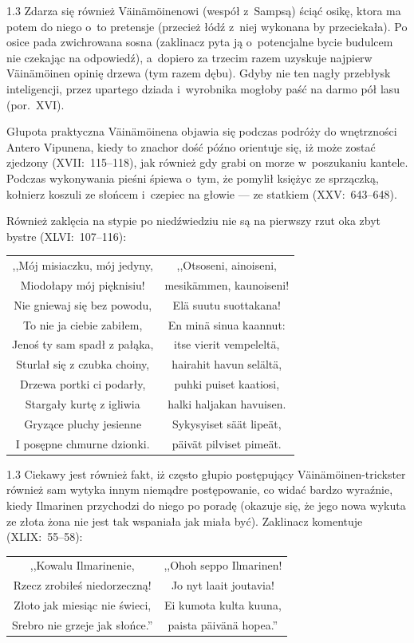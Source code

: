 \documentclass[11pt,a4paper,twoside]{report}
\begin{document}
\begin{spacing}{1.3}
Zdarza się również Väinämöinenowi (wespół z~Sampsą) ściąć osikę, ktora ma potem do niego o~to pretensje (przecież łódź z~niej wykonana by przeciekała). Po osice pada zwichrowana sosna (zaklinacz pyta ją o~potencjalne bycie budulcem nie czekając na odpowiedź), a~dopiero za trzecim razem uzyskuje najpierw Väinämöinen opinię drzewa (tym razem dębu). Gdyby nie ten nagły przebłysk inteligencji, przez upartego dziada i~wyrobnika mogłoby paść na darmo pół lasu (por.~XVI).

Głupota praktyczna Väinämöinena objawia się podczas podróży do wnętrzności Antero Vipunena, kiedy to znachor dość późno orientuje się, iż może zostać zjedzony (XVII:~115--118), jak również gdy grabi on morze w~poszukaniu kantele. Podczas wykonywania pieśni śpiewa o~tym, że pomylił księżyc ze sprzączką, kołnierz koszuli ze słońcem i~czepiec na głowie --- ze statkiem (XXV:~643--648).

Również zaklęcia na stypie po niedźwiedziu nie są na pierwszy rzut oka zbyt bystre (XLVI:~107--116):
\end{spacing}
{\centering
\small
\begin{longtable}{c c}
,,Mój misiaczku, mój jedyny, & ,,Otsoseni, ainoiseni, \\
Miodołapy mój pięknisiu! & mesikämmen, kaunoiseni! \\
Nie gniewaj się bez powodu, & Elä suutu suottakana! \\
To nie ja ciebie zabiłem, & En minä sinua kaannut: \\
Jenoś ty sam spadł z pałąka, & itse vierit vempeleltä, \\
Sturlał się z czubka choiny, & hairahit havun selältä, \\
Drzewa portki ci podarły, & puhki puiset kaatiosi, \\
Stargały kurtę z igliwia & halki haljakan havuisen. \\
Gryzące pluchy jesienne & Sykysyiset säät lipeät, \\
I posępne chmurne dzionki. & päivät pilviset pimeät. \\
\end{longtable}
}
\begin{spacing}{1.3}
Ciekawy jest również fakt, iż często głupio postępujący Väinämöinen-trickster również sam wytyka innym niemądre postępowanie, co widać bardzo wyraźnie, kiedy Ilmarinen przychodzi do niego po poradę (okazuje się, że jego nowa wykuta ze złota żona nie jest tak wspaniała jak miała być). Zaklinacz komentuje (XLIX:~55--58):
\end{spacing}
{\centering
\small
\begin{longtable}{c c}
,,Kowalu Ilmarinenie, & ,,Ohoh seppo Ilmarinen! \\
Rzecz zrobiłeś niedorzeczną! & Jo nyt laait joutavia! \\
Złoto jak miesiąc nie świeci, & Ei kumota kulta kuuna, \\
Srebro nie grzeje jak słońce.'' & paista päivänä hopea.'' \\
\end{longtable}
}
\vspace*{\baselineskip}
\end{document}
